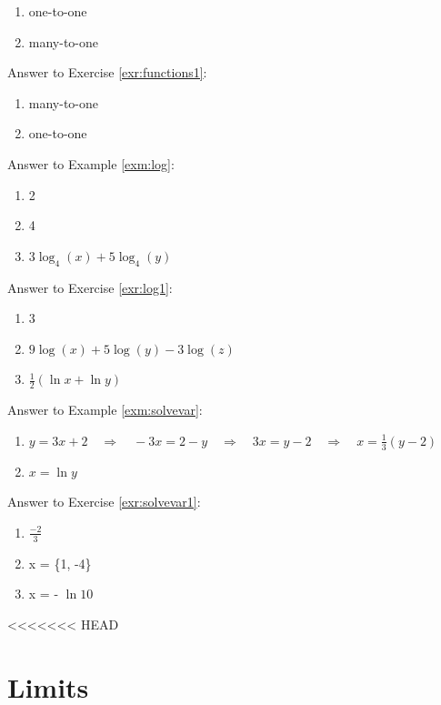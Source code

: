 \documentclass[]{book}
\theoremstyle{definition}
\theoremstyle{definition}
\theoremstyle{definition}
\theoremstyle{remark}
\begin{document}
\begin{enumerate}
\def\labelenumi{\arabic{enumi}.}
\item
  one-to-one
\item
  many-to-one
\end{enumerate}

Answer to Exercise \ref{exr:functions1}:

\begin{enumerate}
\def\labelenumi{\arabic{enumi}.}
\item
  many-to-one
\item
  one-to-one
\end{enumerate}

Answer to Example \ref{exm:log}:

\begin{enumerate}
\def\labelenumi{\arabic{enumi}.}
\item
  2
\item
  4
\item
  \(3\log_4(x) + 5\log_4(y)\)
\end{enumerate}

Answer to Exercise \ref{exr:log1}:

\begin{enumerate}
\def\labelenumi{\arabic{enumi}.}
\item
  3
\item
  \(9\log(x) + 5\log(y) - 3\log(z)\)
\item
  \(\frac{1}{2}(\ln{x} + \ln{y})\)
\end{enumerate}

Answer to Example \ref{exm:solvevar}:

\begin{enumerate}
\def\labelenumi{\arabic{enumi}.}
\item
  \(y=3x+2 \quad\Longrightarrow\quad -3x=2-y \quad\Longrightarrow\quad 3x=y-2 \quad\Longrightarrow\quad x=\frac{1}{3}(y-2)\)
\item
  \(x = \ln{y}\)
\end{enumerate}

Answer to Exercise \ref{exr:solvevar1}:

\begin{enumerate}
\def\labelenumi{\arabic{enumi}.}
\item
  \(\frac{-2}{3}\)
\item
  x = \{1, -4\}
\item
  x = - \(\ln10\)
\end{enumerate}

<<<<<<< HEAD
\hypertarget{limits-precalc}{%
\chapter{Limits}\label{limits-precalc}}
\end{document}
